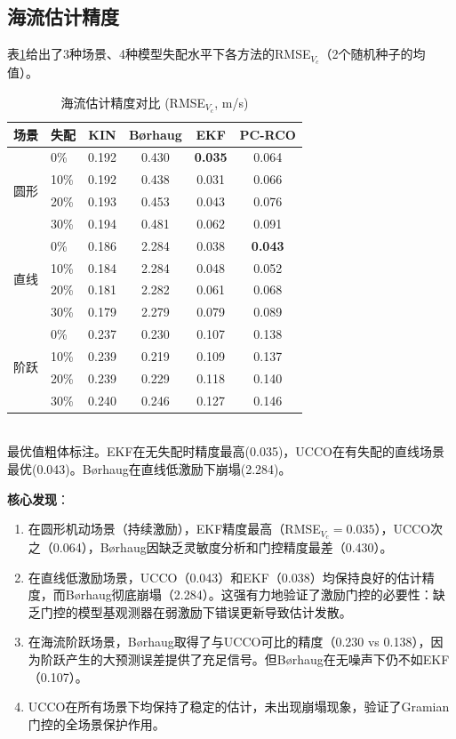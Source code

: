 \subsection{海流估计精度}

表\ref{tab:accuracy}给出了3种场景、4种模型失配水平下各方法的RMSE$_{V_c}$（2个随机种子的均值）。

\begin{table}[h]
\centering
\caption{海流估计精度对比 (RMSE$_{V_c}$, m/s)}
\label{tab:accuracy}
\begin{tabular}{llcccc}
\toprule
场景 & 失配 & KIN & B{\o}rhaug & EKF & PC-RCO \\
\midrule
\multirow{4}{*}{圆形} & 0\%   & 0.192 & 0.430 & \textbf{0.035} & 0.064 \\
                      & 10\%  & 0.192 & 0.438 & 0.031 & 0.066 \\
                      & 20\%  & 0.193 & 0.453 & 0.043 & 0.076 \\
                      & 30\%  & 0.194 & 0.481 & 0.062 & 0.091 \\
\midrule
\multirow{4}{*}{直线} & 0\%   & 0.186 & 2.284 & 0.038 & \textbf{0.043} \\
                      & 10\%  & 0.184 & 2.284 & 0.048 & 0.052 \\
                      & 20\%  & 0.181 & 2.282 & 0.061 & 0.068 \\
                      & 30\%  & 0.179 & 2.279 & 0.079 & 0.089 \\
\midrule
\multirow{4}{*}{阶跃} & 0\%   & 0.237 & 0.230 & 0.107 & 0.138 \\
                      & 10\%  & 0.239 & 0.219 & 0.109 & 0.137 \\
                      & 20\%  & 0.239 & 0.229 & 0.118 & 0.140 \\
                      & 30\%  & 0.240 & 0.246 & 0.127 & 0.146 \\
\bottomrule
\end{tabular}
\\[4pt]
\footnotesize{最优值粗体标注。EKF在无失配时精度最高(0.035)，UCCO在有失配的直线场景最优(0.043)。B{\o}rhaug在直线低激励下崩塌(2.284)。}
\end{table}

\textbf{核心发现}：
\begin{enumerate}
    \item 在圆形机动场景（持续激励），EKF精度最高（RMSE$_{V_c}=0.035$），UCCO次之（0.064），B{\o}rhaug因缺乏灵敏度分析和门控精度最差（0.430）。
    \item 在直线低激励场景，UCCO（0.043）和EKF（0.038）均保持良好的估计精度，而B{\o}rhaug彻底崩塌（2.284）。这强有力地验证了激励门控的必要性：缺乏门控的模型基观测器在弱激励下错误更新导致估计发散。
    \item 在海流阶跃场景，B{\o}rhaug取得了与UCCO可比的精度（0.230 vs 0.138），因为阶跃产生的大预测误差提供了充足信号。但B{\o}rhaug在无噪声下仍不如EKF（0.107）。
    \item UCCO在所有场景下均保持了稳定的估计，未出现崩塌现象，验证了Gramian门控的全场景保护作用。
\end{enumerate}

